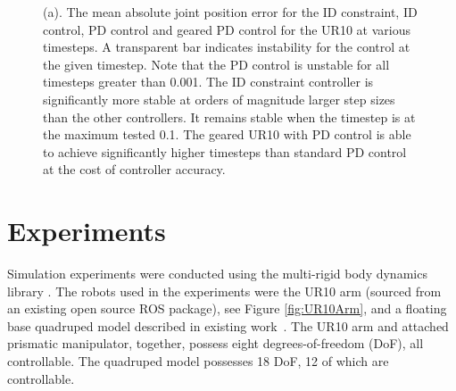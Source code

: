 \documentclass[conference]{IEEEtran}
\begin{document}
\begin{figure}[htbp]
\centering
{}
\caption{(a). The mean absolute joint position error for the ID constraint, ID control, PD control and geared PD control for the UR10 at various timesteps.  A transparent bar indicates instability for the control at the given timestep.  Note that the PD control is unstable for all timesteps greater than 0.001.  The ID constraint controller is significantly more stable at orders of magnitude larger step sizes than the other controllers. It remains stable when the timestep is at the maximum tested 0.1.  The geared UR10 with PD control is able to achieve significantly higher timesteps than standard PD control at the cost of controller accuracy.}
\label{fig:pos_error}
\end{figure}



\section{Experiments}

Simulation experiments were conducted using the multi-rigid body dynamics library .  The robots used in the experiments were the UR10 arm (sourced from an existing open source ROS package), see Figure \ref{fig:UR10Arm}, and a floating base quadruped model described in existing work~\cite{Zapolsky:2015}.  The UR10 arm and attached prismatic manipulator, together, possess eight degrees-of-freedom (DoF), all controllable. The quadruped model possesses 18 DoF, 12 of which are controllable.
\end{document}
